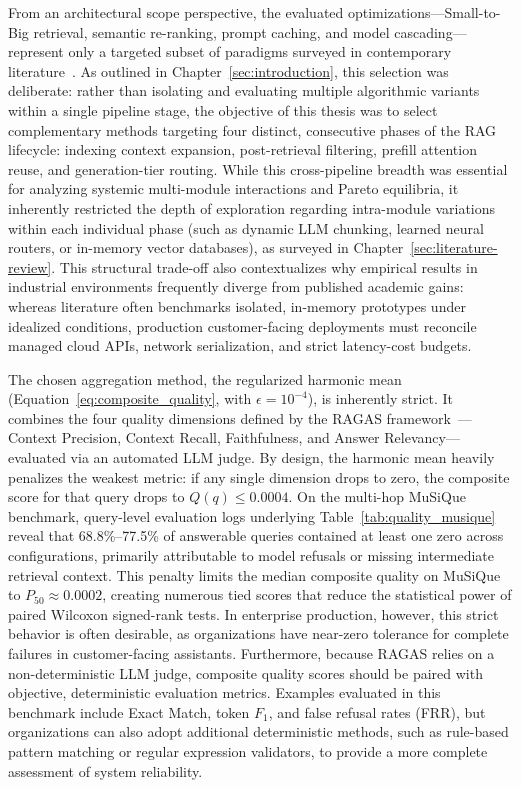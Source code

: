 From an architectural scope perspective, the evaluated optimizations---Small-to-Big retrieval, semantic re-ranking, prompt caching, and model cascading---represent only a targeted subset of paradigms surveyed in contemporary literature~\citep{gao2023retrieval, wu2025ragnlp, gan2025rag}. As outlined in Chapter~\ref{sec:introduction}, this selection was deliberate: rather than isolating and evaluating multiple algorithmic variants within a single pipeline stage, the objective of this thesis was to select complementary methods targeting four distinct, consecutive phases of the RAG lifecycle: indexing context expansion, post-retrieval filtering, prefill attention reuse, and generation-tier routing. While this cross-pipeline breadth was essential for analyzing systemic multi-module interactions and Pareto equilibria, it inherently restricted the depth of exploration regarding intra-module variations within each individual phase (such as dynamic LLM chunking, learned neural routers, or in-memory vector databases), as surveyed in Chapter~\ref{sec:literature-review}. This structural trade-off also contextualizes why empirical results in industrial environments frequently diverge from published academic gains: whereas literature often benchmarks isolated, in-memory prototypes under idealized conditions, production customer-facing deployments must reconcile managed cloud APIs, network serialization, and strict latency-cost budgets.

The chosen aggregation method, the regularized harmonic mean (Equation~\ref{eq:composite_quality}, with $\epsilon = 10^{-4}$), is inherently strict. It combines the four quality dimensions defined by the RAGAS framework~\citep{es2024ragas}---Context Precision, Context Recall, Faithfulness, and Answer Relevancy---evaluated via an automated LLM judge. By design, the harmonic mean heavily penalizes the weakest metric: if any single dimension drops to zero, the composite score for that query drops to $Q(q) \le 0.0004$. On the multi-hop MuSiQue benchmark, query-level evaluation logs underlying Table~\ref{tab:quality_musique} reveal that 68.8\%--77.5\% of answerable queries contained at least one zero across configurations, primarily attributable to model refusals or missing intermediate retrieval context. This penalty limits the median composite quality on MuSiQue to $P_{50} \approx 0.0002$, creating numerous tied scores that reduce the statistical power of paired Wilcoxon signed-rank tests. In enterprise production, however, this strict behavior is often desirable, as organizations have near-zero tolerance for complete failures in customer-facing assistants. Furthermore, because RAGAS relies on a non-deterministic LLM judge, composite quality scores should be paired with objective, deterministic evaluation metrics. Examples evaluated in this benchmark include Exact Match, token $F_1$, and false refusal rates (FRR), but organizations can also adopt additional deterministic methods, such as rule-based pattern matching or regular expression validators, to provide a more complete assessment of system reliability.

